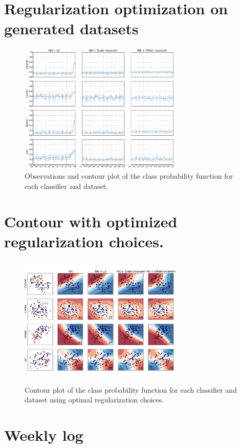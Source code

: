 
\onecolumn
\section{Regularization optimization on generated datasets}
\label{appendix:regualization-optimization}
\begin{figure}[H]
	\centering
	\includegraphics[width=0.7\textwidth]{plots/syntetic_reg_opt}
	\caption{Observations and contour plot of the class probability function for each classifier and dataset.}
\end{figure}

\section{Contour with optimized regularization choices.}
\label{appendix:generated-contour-optimized}
\begin{figure}[H]
	\centering
	\includegraphics[width=0.7\textwidth, trim = 0 2.2cm 0 1.5cm, clip]{plots/2d_classifier-optimized}
	\caption{Contour plot of the class probability function for each classifier and dataset using optimal regularization choices.}
\end{figure}

\twocolumn
\section{Weekly log}










